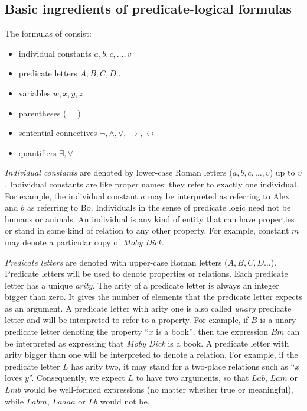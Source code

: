 \documentclass[nobib,nofonts]{tufte-handout}
\newcommand{\predlog}{\acro{PredLog}}
\begin{document}
\subsection{Basic ingredients of predicate-logical formulas}

The formulas of \predlog consist:
\begin{multicols}{2}
\begin{itemize}
  \item individual constants $a,b,c, \dots, v$
  \item predicate letters $A, B, C, D \dots$
  \item variables $w, x,y,z$
  \item parentheses ( \ \ )
  \item sentential connectives $\neg, \wedge, \vee, \rightarrow, \leftrightarrow$
  \item quantifiers $\exists, \forall$
\end{itemize}
\end{multicols}
\emph{Individual constants} are denoted by lower-case Roman letters ($a, b, c, \dots, v $) up to $v$.
Individual constants are like proper names: they refer to exactly one individual.
For example, the individual constant $a$ may be interpreted as referring to Alex and $b$ as referring to Bo.
Individuals in the sense of predicate logic need not be humans or animals. An individual is any kind of entity that can have properties or stand in some kind of relation to any other property. For example, constant $m$ may denote a particular copy of \emph{Moby Dick}.

\emph{Predicate letters} are denoted with upper-case Roman letters ($A, B, C, D \dots$).
Predicate letters will be used to denote properties or relations.
Each predicate letter has a unique \emph{arity}.
The arity of a predicate letter is always an integer bigger than zero.
It gives the number of elements that the predicate letter expects as an argument.
A predicate letter with arity one is also called \emph{unary} predicate letter and will be interpreted to refer to a property.
For example, if $B$ is a unary predicate letter denoting the property ``$x$ is a book'', then the expression $Bm$ can be interpreted as expressing that \emph{Moby Dick} is a book.
A predicate letter with arity bigger than one will be interpreted to denote a relation.
For example, if the predicate letter $L$ has arity two, it may stand for a two-place relations such as ``$x$ loves $y$''.
Consequently, we expect $L$ to have two arguments, so that $Lab$, $Lam$ or $Lmb$ would be well-formed expressions (no matter whether true or meaningful), while $Labm$, $Laaaa$ or $Lb$ would not be.
\end{document}
